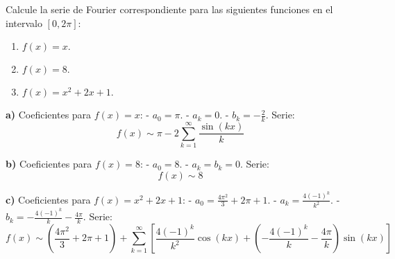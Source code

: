 \begin{prob}
Calcule la serie de Fourier correspondiente para las siguientes funciones en el intervalo $\left[  0,2\pi \right]:$
\begin{enumerate} 
\item $f(x)=x.$
\item $f(x)=8.$
\item $f(x)=x^2+2x+1.$
\end{enumerate}	
\begin{myproof}
\textbf{a)} Coeficientes para \( f(x) = x \):  
- \( a_0 = \pi \).  
- \( a_k = 0 \).  
- \( b_k = -\frac{2}{k} \).  
Serie:  
\[
\boxed{f(x) \sim \pi - 2 \sum_{k=1}^{\infty} \frac{\sin(kx)}{k}}
\]

\textbf{b)} Coeficientes para \( f(x) = 8 \):  
- \( a_0 = 8 \).  
- \( a_k = b_k = 0 \).  
Serie:  
\[
\boxed{f(x) \sim 8}
\]

\textbf{c)} Coeficientes para \( f(x) = x^2 + 2x + 1 \):  
- \( a_0 = \frac{4\pi^2}{3} + 2\pi + 1 \).  
- \( a_k = \frac{4(-1)^k}{k^2} \).  
- \( b_k = -\frac{4(-1)^k}{k} - \frac{4\pi}{k} \).  
Serie:  
\[
\boxed{f(x) \sim \left( \frac{4\pi^2}{3} + 2\pi + 1 \right) + \sum_{k=1}^{\infty} \left[ \frac{4(-1)^k}{k^2} \cos(kx) + \left( -\frac{4(-1)^k}{k} - \frac{4\pi}{k} \right) \sin(kx) \right]}
\]
\end{myproof}
\end{prob}

